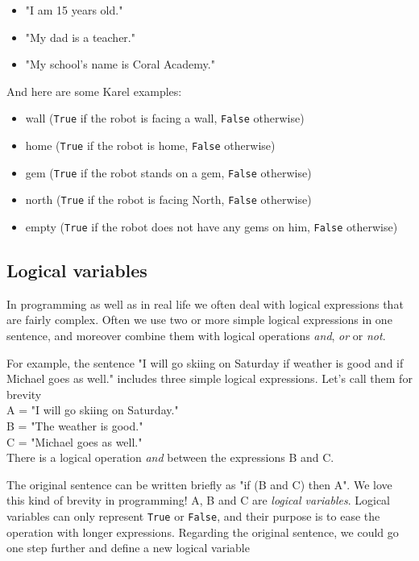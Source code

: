\begin{itemize}
\item "I am 15 years old."
\item "My dad is a teacher."
\item "My school's name is Coral Academy."
\end{itemize}
And here are some Karel examples:
\begin{itemize}
\item wall ({\tt True} if the robot is facing a wall, {\tt False} otherwise)
\item home ({\tt True} if the robot is home, {\tt False} otherwise)
\item gem ({\tt True} if the robot stands on a gem, {\tt False} otherwise)
\item north ({\tt True} if the robot is facing North, {\tt False} otherwise)
\item empty ({\tt True} if the robot does not have any gems on him, {\tt False} otherwise)
\end{itemize}

\subsection{Logical variables}

In programming as well as in real life we often deal with logical expressions that are 
fairly complex. Often we use two or more simple logical expressions in one sentence, 
and moreover combine them with logical operations {\em and}, {\em or} or {\em not}.

For example, the sentence "I will go skiing on Saturday if weather is good and if 
Michael goes as well." includes three simple logical expressions. Let's call 
them for brevity\\

\noindent
A = "I will go skiing on Saturday."\\
B = "The weather is good."\\
C = "Michael goes as well."\\

\noindent
There is a logical operation {\em and} between the expressions B and C.

The original sentence can be written briefly as "if (B and C) then A". We love this kind of 
brevity in programming! A, B and C are {\em logical variables}. Logical variables 
can only represent {\tt True} or {\tt False}, and their purpose is to ease the operation with 
longer expressions.
Regarding the original sentence, we could go one step further and define a new logical variable\\


